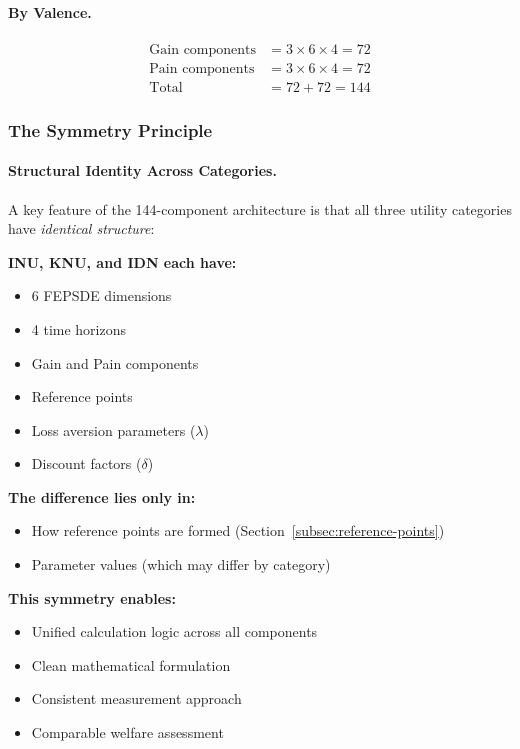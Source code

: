 \paragraph{By Valence.}
\begin{align*}
\text{Gain components} &= 3 \times 6 \times 4 = 72 \\
\text{Pain components} &= 3 \times 6 \times 4 = 72 \\
\text{Total} &= 72 + 72 = 144
\end{align*}

\subsubsection{The Symmetry Principle}

\paragraph{Structural Identity Across Categories.}
A key feature of the 144-component architecture is that all three 
utility categories have \emph{identical structure}:

\begin{tcolorbox}[colback=blue!5!white, colframe=blue!75!black, title=The Symmetry Principle]
\textbf{INU, KNU, and IDN each have:}
\begin{itemize}
\item 6 FEPSDE dimensions
\item 4 time horizons
\item Gain and Pain components
\item Reference points
\item Loss aversion parameters ($\lambda$)
\item Discount factors ($\delta$)
\end{itemize}

\textbf{The difference lies only in:}
\begin{itemize}
\item How reference points are formed (Section~\ref{subsec:reference-points})
\item Parameter values (which may differ by category)
\end{itemize}

\textbf{This symmetry enables:}
\begin{itemize}
\item Unified calculation logic across all components
\item Clean mathematical formulation
\item Consistent measurement approach
\item Comparable welfare assessment
\end{itemize}
\end{tcolorbox}

